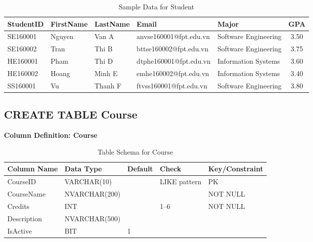 \documentclass[12pt,a4paper]{report}
\begin{document}
\begin{table}[ht]
\centering
\small
\begin{tabular}{|l|l|l|p{4.2cm}|p{4.2cm}|c|}
\hline
\textbf{StudentID} & \textbf{FirstName} & \textbf{LastName} & \textbf{Email} & \textbf{Major} & \textbf{GPA} \\ \hline
SE160001 & Nguyen & Van A & anvse160001@fpt.edu.vn & Software Engineering & 3.50 \\ \hline
SE160002 & Tran & Thi B & bttse160002@fpt.edu.vn & Software Engineering & 3.75 \\ \hline
HE160001 & Pham & Thi D & dtphe160001@fpt.edu.vn & Information Systems & 3.60 \\ \hline
HE160002 & Hoang & Minh E & emhe160002@fpt.edu.vn & Information Systems & 3.40 \\ \hline
SS160001 & Vu & Thanh F & ftvss160001@fpt.edu.vn & Software Engineering & 3.80 \\ \hline
\end{tabular}
\caption{Sample Data for Student}
\label{tab:student_data}
\end{table}

\vspace{1cm}

\subsection{CREATE TABLE Course}

\textbf{Column Definition: Course}

\begin{table}[ht]
\centering
\small
\begin{tabular}{|l|l|l|l|l|}
\hline
\textbf{Column Name} & \textbf{Data Type} & \textbf{Default} & \textbf{Check} & \textbf{Key/Constraint} \\ \hline
CourseID & VARCHAR(10) & & LIKE pattern & PK \\ \hline
CourseName & NVARCHAR(200) & & & NOT NULL \\ \hline
Credits & INT & & 1--6 & NOT NULL \\ \hline
Description & NVARCHAR(500) & & & \\ \hline
IsActive & BIT & 1 & & \\ \hline
\end{tabular}
\caption{Table Schema for Course}
\label{tab:course_schema}
\end{table}
\end{document}
